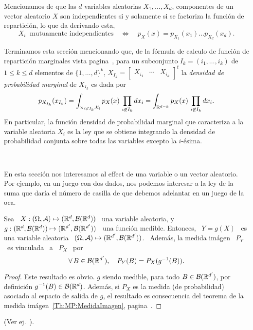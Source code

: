 Mencionamos de que las $d$  variables aleatorias $X_1, \ldots, X_d$, componentes
de un vector aleatorio $X$ son  independientes si y solamente si se factoriza la
funci\'on de repartici\'on, lo que da derivando esta,
%
\[
X_i \:  \mbox{ mutuamente independientes} \quad \Leftrightarrow  \quad p_X(x) =
p_{X_1}(x_1) \ldots p_{X_d}(x_d).
\]


Terminamos esta secci\'on mencionando que, de la f\'ormula de calculo de funci\'on
de  repartici\'on marginales vista  pagina~\pageref{Pagina:MP:MarginalesF}, para
un subconjunto $I_k = (i_1,\ldots,i_k)$ de $1  \le k \le d$ elementos de $\{ 1 ,
\ldots   ,  d   \}^k$,   $X_{I_k}   =  \begin{bmatrix}   X_{i_1}   &  \cdots   &
  X_{i_k}\end{bmatrix}^t$  la   {\it  densidad  de   probabilidad  marginal}  de
$X_{I_k}$ es dada por
%
\[
p_{X_{I_k}}(x_{I_k})  = \int_{\times_{i  \not\in  I_k} \mathcal{X}_i}  p_X(x) \,  \prod_{i
    \not\in I_k}  dx_i =  \int_{\mathbb{R}^{d-k}} p_X(x) \,  \prod_{i \not\in
      I_k} dx_i.
\]
%
En particular, la funci\'on densidad  de probabilidad marginal que caracteriza a
la variable aleatoria  $X_i$ es la ley que se obtiene  integrando la densidad de
probabilidad conjunta sobre todas las variables excepto la $i$-\'esima.

\




\label{Ssec:MP:Transformacion}

En  esta  secci\'on nos  interesamos  al  effect de  una  variable  o un  vector
aleatorio. Por  ejemplo, en un juego con  dos dados, nos podemos  interesar a la
ley de la suma que dar\'ia el n\'umero de casilla de que debemos adelantar en un
juego de la oca.
%
\begin{teorema}
  Sea  \  $X:  (\Omega,\mathcal{A})  \mapsto  (\mathbb{R}^d ,  \mathcal{B}(\mathbb{R}^d))$  \  una  variable
  aleatoria,   y  \   $g:  (\mathbb{R}^d   ,  \mathcal{B}(\mathbb{R}^d))   \mapsto   (\mathbb{R}^{d'}  ,
  \mathcal{B}(\mathbb{R}^{d'}))$ \  una funci\'on  medible. Entonces,  \ $Y =  g(X)$ \  es una
  variable aleatoria  \ $(\Omega,\mathcal{A})  \mapsto (\mathbb{R}^{d'} ,  \mathcal{B}(\mathbb{R}^{d'}))$. \
  Adem\'as, la medida im\'agen \ $P_Y$ \ es vinculada \ a \ $P_X$ \ por
  \[
  \forall \, B \in \mathcal{B}(\mathbb{R}^{d'}), \quad P_Y(B) = P_X(g^{-1}(B)).
  \]
\end{teorema}
%
\begin{proof}
  Este resultado es obvio. $g$ siendo medible, para todo $B \in \mathcal{B}(\mathbb{R}^{d'})$,
  por definici\'on $g^{-1}(B) \in \mathcal{B}(\mathbb{R}^d)$.  Adem\'as, si $P_X$ es la medida
  (de  probabilidad) asociado  al  espacio de  salida  de $g$,  el resultado  es
  consecuencia  del   teorema  de  la   medida  im\'agen~\ref{Th:MP:MedidaImagen},
  pagina~\pageref{Th:MP:MedidaImagen}.
\end{proof}
%
\noindent (Ver ej.~\cite{JacPro03, AthLah06, Bog07:v2, Coh13}).


